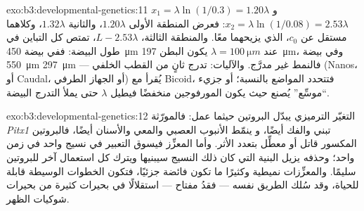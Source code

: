 \begin{solution}{exo:b3:developmental-genetics:11}
$x_{1} = \lambda\ln(1/0.3) = 1.20\lambda$ و$x_{2} = \lambda\ln(1/0.08)
= 2.53\lambda$: فعرض المنطقة الأولى $1.20\lambda$، والثانية
$1.32\lambda$، وكلاهما مستقل عن $c_{0}$، الذي يزيحهما معًا.
والمنطقة الثالثة، $L - 2.53\lambda$، تمتص كل التباين في طول
البيضة: ففي بيضة \qty{450}{\micro m} عند $\lambda = \qty{100}{\micro m}$
يكون البطن \qty{197}{\micro m}، وفي بيضة \qty{550}{\micro m}
\qty{297}{\micro m} --- فالنمط غير مدرَّج. والآليات: تدرج ثانٍ
من القطب الخلفي (Nanos، أو Caudal، أو الجهاز الطرفي) يُقرأ مع
Bicoid، فتتحدد المواضع بالنسبة؛ أو جزيء ``موسِّع'' يُصنع حيث
يكون المورفوجين منخفضًا فيطيل $\lambda$ حتى يملأ التدرج
البيضة.
\end{solution}

\begin{solution}{exo:b3:developmental-genetics:12}
التغيّر الترميزي يبدّل البروتين حيثما عمل: فالمورّثة
\emph{Pitx1} تبني  والفك أيضًا، و\emph{}
ينمّط الأنبوب العصبي والمعي والأسنان أيضًا، فالبروتين المكسور
قاتل أو معطِّل بتعدد الأثر. وأما المعزِّز فيسوق التعبير في
نسيج واحد في زمن واحد؛ وحذفه يزيل البنية التي كان ذلك النسيج
سيبنيها ويترك كل استعمال آخر للبروتين سليمًا. والمعزِّزات
نميطية وكثيرًا ما تكون فائضة جزئيًا، فتكون الخطوات الوسيطة
قابلة للحياة، وقد سُلك الطريق نفسه --- فقدُ مفتاح --- استقلالًا
في بحيرات كثيرة من بحيرات شوكيات الظهر.
\end{solution}

